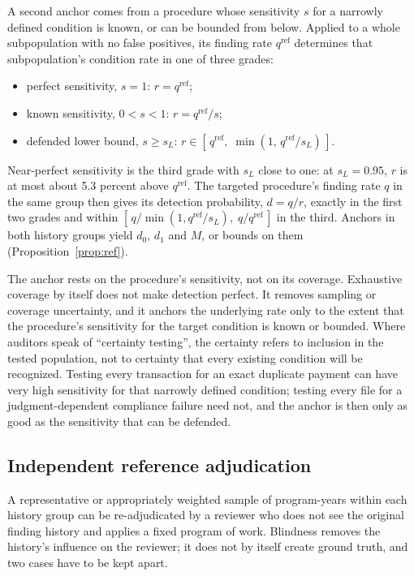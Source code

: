 A second anchor comes from a procedure whose sensitivity $s$ for a narrowly
defined condition is known, or can be bounded from below. Applied to a whole
subpopulation with no false positives, its finding rate $q^{\mathrm{ref}}$
determines that subpopulation's condition rate in one of three grades:
%
\begin{itemize}
\item perfect sensitivity, $s = 1$: $r = q^{\mathrm{ref}}$;
\item known sensitivity, $0 < s < 1$: $r = q^{\mathrm{ref}}/s$;
\item defended lower bound, $s \ge s_L$:
  $r \in [\,q^{\mathrm{ref}},\; \min(1,\, q^{\mathrm{ref}}/s_L)\,]$.
\end{itemize}
%
Near-perfect sensitivity is the third grade with $s_L$ close to one: at $s_L =
0.95$, $r$ is at most about 5.3 percent above $q^{\mathrm{ref}}$. The targeted
procedure's finding rate $q$ in the same group then gives its detection
probability, $d = q/r$, exactly in the first two grades and within
$[\,q/\min(1, q^{\mathrm{ref}}/s_L),\; q/q^{\mathrm{ref}}\,]$ in the third.
Anchors in both history groups yield $d_0$, $d_1$ and $M$, or bounds on
them (Proposition~\ref{prop:ref}).

The anchor rests on the procedure's sensitivity, not on its coverage.
Exhaustive coverage by itself does not make detection perfect. It removes
sampling or coverage uncertainty, and it anchors the underlying rate only to
the extent that the procedure's sensitivity for the target condition is known
or bounded. Where auditors speak of ``certainty
testing'', the certainty refers to inclusion in the tested population, not to
certainty that every existing condition will be recognized. Testing every
transaction for an exact duplicate payment can have very high sensitivity
for that narrowly defined condition; testing every file for a
judgment-dependent compliance failure need not, and the anchor is then only as
good as the sensitivity that can be defended.

\subsection{Independent reference adjudication}

A representative or appropriately weighted sample of program-years within
each history group can be re-adjudicated by a reviewer who does not see the
original finding history and applies a fixed program of work. Blindness
removes the history's influence on the reviewer; it does not by itself create
ground truth, and two cases have to be kept apart.

